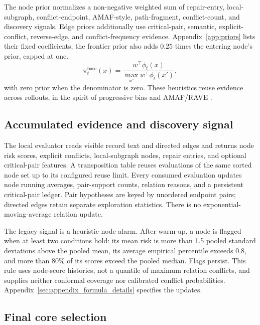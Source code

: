 \begin{revadded}
The node prior normalizes a non-negative weighted sum of repair-entry, local-subgraph, conflict-endpoint, AMAF-style, path-fragment, conflict-count, and discovery signals. Edge priors additionally use critical-pair, semantic, explicit-conflict, reverse-edge, and conflict-frequency evidence. Appendix~\ref{app:priors} lists their fixed coefficients; the frontier prior also adds $0.25$ times the entering node's prior, capped at one.
\begin{equation}
 \pi_t^{\mathrm{base}}(x)=\frac{w^\top\phi_t(x)}{\max_{x'}w^\top\phi_t(x')},
 \label{eq:relation-prior}
\end{equation}
with zero prior when the denominator is zero. These heuristics reuse evidence across rollouts, in the spirit of progressive bias and AMAF/RAVE \citep{gelly2007combining,browne2012survey}.

\subsection{Accumulated evidence and discovery signal}

The local evaluator reads visible record text and directed edges and returns node risk scores, explicit conflicts, local-subgraph nodes, repair entries, and optional critical-pair features. A transposition table reuses evaluations of the same sorted node set up to its configured reuse limit. Every consumed evaluation updates node running averages, pair-support counts, relation reasons, and a persistent critical-pair ledger. Pair hypotheses are keyed by unordered endpoint pairs; directed edges retain separate exploration statistics. There is no exponential-moving-average relation update.

The legacy \oc{} signal is a heuristic node alarm. After warm-up, a node is flagged when at least two conditions hold: its mean risk is more than 1.5 pooled standard deviations above the pooled mean, its average empirical percentile exceeds 0.8, and more than 80\% of its scores exceed the pooled median. Flags persist. This rule uses node-score histories, not a quantile of maximum relation conflicts, and supplies neither conformal coverage nor calibrated conflict probabilities. Appendix~\ref{sec:appendix_formula_details} specifies the updates.

\subsection{Final core selection}
\label{sec:dynamic-core}


\end{revadded}
